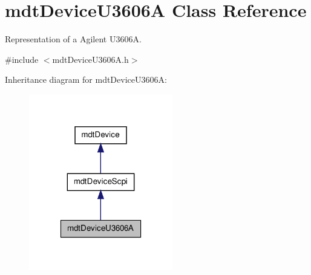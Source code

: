 \hypertarget{classmdt_device_u3606_a}{
\section{mdtDeviceU3606A Class Reference}
\label{classmdt_device_u3606_a}
}


Representation of a Agilent U3606A.  




{\ttfamily \#include $<$mdtDeviceU3606A.h$>$}



Inheritance diagram for mdtDeviceU3606A:\nopagebreak
\begin{figure}[H]
\begin{center}
\leavevmode
\includegraphics[width=178pt]{classmdt_device_u3606_a__inherit__graph}
\end{center}
\end{figure}


